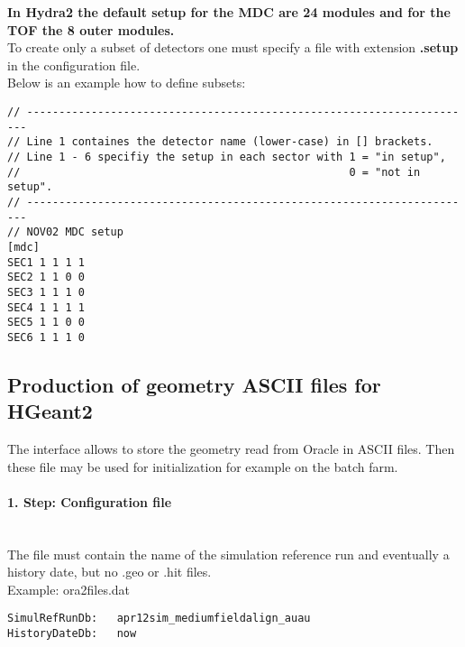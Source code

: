 \begin{itemize}
   \textbf{In Hydra2 the default setup for the MDC are 24 modules and for the TOF the 8 outer modules.}\\
   To create only a subset of detectors one must specify a file with extension \textbf{.setup} in the configuration file.\\
   Below is an example how to define subsets:
   \begin{lstlisting}
// ----------------------------------------------------------------------
// Line 1 containes the detector name (lower-case) in [] brackets.
// Line 1 - 6 specifiy the setup in each sector with 1 = "in setup",
//                                                   0 = "not in setup".
// ----------------------------------------------------------------------
// NOV02 MDC setup
[mdc]
SEC1 1 1 1 1
SEC2 1 1 0 0
SEC3 1 1 1 0
SEC4 1 1 1 1
SEC5 1 1 0 0
SEC6 1 1 1 0
   \end{lstlisting}

\end{itemize}


\subsection[Production of geometry ASCII files for HGeant2]{Production of geometry ASCII files for HGeant2} 
\label{sec:geomCreateGeoFiles}

The interface allows to store the geometry read from Oracle in ASCII files. Then these file may be used for 
initialization for example on the batch farm.

\paragraph{1. Step: Configuration file} ~\\
The file must contain the name of the simulation reference run and eventually a history date, but no .geo or .hit files.\\
Example: ora2files.dat
\begin{lstlisting}
SimulRefRunDb:   apr12sim_mediumfieldalign_auau
HistoryDateDb:   now
\end{lstlisting}

